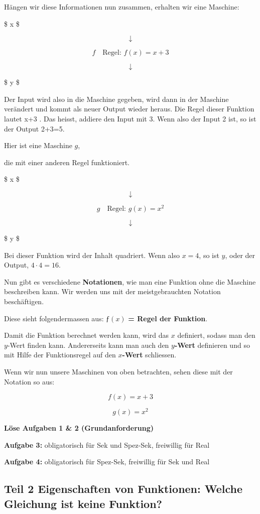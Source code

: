 \documentclass[
  10pt,
  a4paper,
  DIV=11]{scrartcl}
\theoremstyle{definition}
\theoremstyle{remark}
\begin{document}
Hängen wir diese Informationen nun zusammen, erhalten wir eine Maschine:

\$  x \$

\[
\downarrow
\]

\[
\boxed{f} \quad \text{Regel: } f(x) = x + 3
\]

\[
\downarrow
\]

\$  y \$

Der Input wird also in die Maschine gegeben, wird dann in der Maschine
verändert und kommt als neuer Output wieder heraus. Die Regel dieser
Funktion lautet x+3 . Das heisst, addiere den Input mit 3. Wenn also der
Input 2 ist, so ist der Output 2+3=5.

Hier ist eine Maschine \(g\),

die mit einer anderen Regel funktioniert.

\$  x \$

\[
\downarrow
\]

\[
\boxed{g} \quad \text{Regel: } g(x) = x^2
\]

\[
\downarrow
\]

\$  y \$

Bei dieser Funktion wird der Inhalt quadriert. Wenn also \(x = 4\), so
ist \(y\), oder der Output, \(4 \cdot 4 = 16\).

Nun gibt es verschiedene \textbf{Notationen}, wie man eine Funktion ohne
die Maschine beschreiben kann. Wir werden uns mit der meistgebrauchten
Notation beschäftigen.

Diese sieht folgendermassen aus: \(ƒ(x)\) \textbf{= Regel der Funktion}.

Damit die Funktion berechnet werden kann, wird das \(x\) definiert,
sodass man den \(y\)-Wert finden kann. Andererseits kann man auch den
\textbf{\(y\)-Wert} definieren und so mit Hilfe der Funktionsregel auf
den \textbf{\(x\)-Wert} schliessen.

Wenn wir nun unsere Maschinen von oben betrachten, sehen diese mit der
Notation so aus:

\[ f(x) = x + 3 \]

\[ g(x) = x^2 \]

\textbf{Löse Aufgaben 1 \& 2 (Grundanforderung)}

\textbf{Aufgabe 3:} obligatorisch für Sek und Spez-Sek, freiwillig für
Real

\textbf{Aufgabe 4:} obligatorisch für Spez-Sek, freiwillig für Sek und
Real

\subsection{Teil 2 Eigenschaften von Funktionen: Welche Gleichung ist
keine
Funktion?}\label{teil-2-eigenschaften-von-funktionen-welche-gleichung-ist-keine-funktion}
\end{document}
